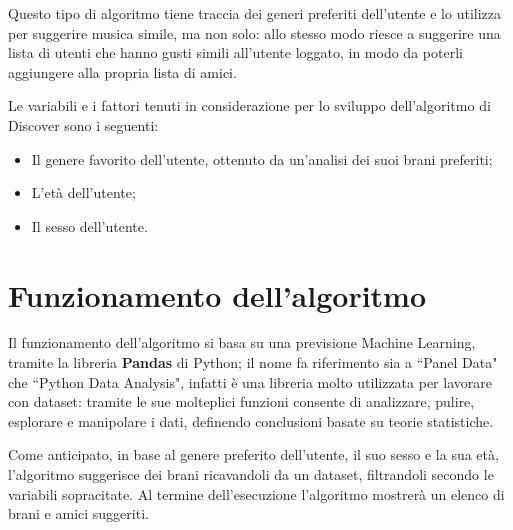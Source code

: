 Questo tipo di algoritmo 
tiene traccia dei generi preferiti dell'utente e lo utilizza per suggerire musica simile, ma non solo: allo stesso modo riesce a suggerire 
una lista di utenti che hanno gusti simili all'utente loggato, in modo da poterli aggiungere alla propria lista di amici.  

Le variabili e i fattori tenuti in considerazione per lo sviluppo dell'algoritmo di Discover sono i seguenti: 
\begin{itemize}
    \item Il genere favorito dell'utente, ottenuto da un'analisi dei suoi brani preferiti;
    \item L'età dell'utente;
    \item Il sesso dell'utente.
\end{itemize}


\section{Funzionamento dell'algoritmo}
Il funzionamento dell'algoritmo si basa su una previsione Machine Learning, tramite la libreria \textbf{Pandas} di Python;
il nome fa riferimento sia a ``Panel Data" che ``Python Data Analysis", infatti è una libreria molto utilizzata per lavorare 
con dataset: tramite le sue molteplici funzioni consente di analizzare, pulire, esplorare e manipolare i dati, definendo 
conclusioni basate su teorie statistiche. 

Come anticipato, in base al genere preferito dell'utente, il suo sesso e la sua età, l'algoritmo suggerisce dei brani ricavandoli 
da un dataset, filtrandoli secondo le variabili sopracitate. Al termine dell'esecuzione l'algoritmo mostrerà un elenco di brani e amici suggeriti.

